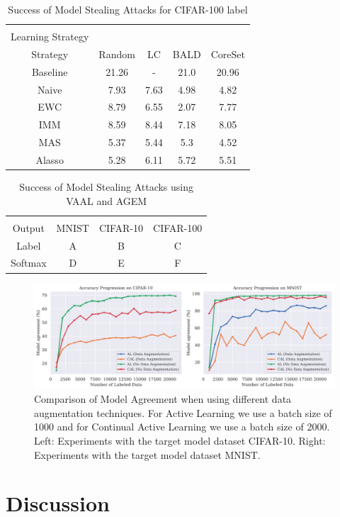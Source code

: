 \begin{table}[h]
    \centering
    \begin{tabular}{c | c c c c } 
        \hline
        \diagbox[width=11em]{Active \\ Learning Strategy}{Continual Learning \\ Strategy} & Random & LC & BALD & CoreSet \\ 
        \hline 
        Baseline & 21.26 & - & 21.0 & 20.96\\
        Naive & 7.93 & 7.63 & 4.98 & 4.82\\
        EWC & 8.79 & 6.55 & 2.07 & 7.77 \\
        IMM & 8.59 & 8.44 & 7.18 & 8.05 \\
        MAS & 5.37 & 5.44 & 5.3 & 4.52 \\
        Alasso & 5.28 & 6.11 & 5.72 & 5.51 \\
        \hline
    \end{tabular}
    \caption{Success of Model Stealing Attacks for CIFAR-100 label}
    \label{fig:ModelStealingCIFAR100Label}
\end{table}


\begin{table}[h]
    \centering
    \begin{tabular}{c | c c c } 
        \hline
        \diagbox[width=11em]{Prediction \\ Output}{Dataset} & MNIST & CIFAR-10 & CIFAR-100 \\ 
        \hline 
        Label & A & B & C\\
        Softmax & D & E & F\\
        \hline
    \end{tabular}
    \caption{Success of Model Stealing Attacks using VAAL and AGEM}
    \label{fig:ModelStealingVAAL_AGEM}
\end{table}

\begin{figure}[h]
    \centering
    \includegraphics[width=\linewidth]{images/results_CALMS/effect_data_augmentation.png}
    \caption[Effect of Data Augmentation on the success of Model Stealing Attacks]{Comparison of Model Agreement when using different data augmentation techniques. For Active Learning we use a batch size of 1000 and for Continual Active Learning
    we use a batch size of 2000. Left: Experiments with the target model dataset CIFAR-10. Right: Experiments with the target model dataset MNIST.}
    \label{fig:Evaluation:Results:CAL:EffectAugmentation}
\end{figure}


\section{Discussion}
\label{sec:Evaluation:ThirdSection}

